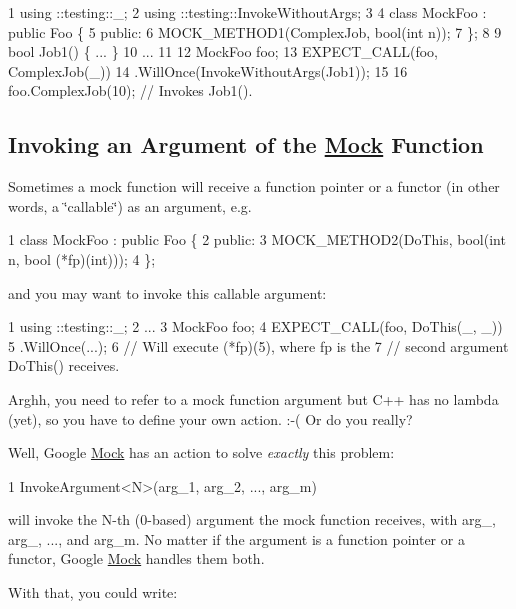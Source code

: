 \begin{DoxyCode}
1 using ::testing::\_;
2 using ::testing::InvokeWithoutArgs;
3 
4 class MockFoo : public Foo \{
5  public:
6   MOCK\_METHOD1(ComplexJob, bool(int n));
7 \};
8 
9 bool Job1() \{ ... \}
10 ...
11 
12   MockFoo foo;
13   EXPECT\_CALL(foo, ComplexJob(\_))
14       .WillOnce(InvokeWithoutArgs(Job1));
15 
16   foo.ComplexJob(10);  // Invokes Job1().
\end{DoxyCode}


\subsection*{Invoking an Argument of the \hyperlink{classMock}{Mock} Function}

Sometimes a mock function will receive a function pointer or a functor (in other words, a \char`\"{}callable\char`\"{}) as an argument, e.\+g.


\begin{DoxyCode}
1 class MockFoo : public Foo \{
2  public:
3   MOCK\_METHOD2(DoThis, bool(int n, bool (*fp)(int)));
4 \};
\end{DoxyCode}


and you may want to invoke this callable argument\+:


\begin{DoxyCode}
1 using ::testing::\_;
2 ...
3   MockFoo foo;
4   EXPECT\_CALL(foo, DoThis(\_, \_))
5       .WillOnce(...);
6   // Will execute (*fp)(5), where fp is the
7   // second argument DoThis() receives.
\end{DoxyCode}


Arghh, you need to refer to a mock function argument but C++ has no lambda (yet), so you have to define your own action. \+:-\/( Or do you really?

Well, Google \hyperlink{classMock}{Mock} has an action to solve {\itshape exactly} this problem\+:


\begin{DoxyCode}
1 InvokeArgument<N>(arg\_1, arg\_2, ..., arg\_m)
\end{DoxyCode}


will invoke the {\ttfamily N}-\/th (0-\/based) argument the mock function receives, with {\ttfamily arg\+\_}, {\ttfamily arg\+\_}, ..., and {\ttfamily arg\+\_\+m}. No matter if the argument is a function pointer or a functor, Google \hyperlink{classMock}{Mock} handles them both.

With that, you could write\+:


